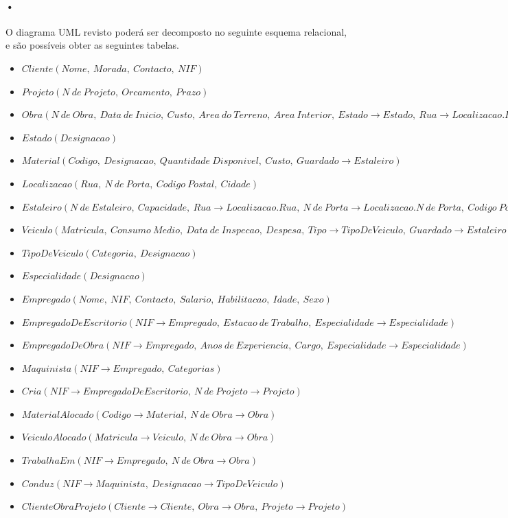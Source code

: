 \documentclass{report}
\begin{document}
		\paragraph{•}O diagrama UML revisto poderá ser decomposto no seguinte esquema
		relacional, e são possíveis obter as seguintes tabelas.
		
		\begin{itemize}
			\item $Cliente(Nome,\ Morada,\ Contacto,\ NIF)$
			\item $Projeto(N\ de\ Projeto,\ Orcamento,\ Prazo)$
			\item $Obra(N\ de\ Obra,\ Data\ de\ Inicio,\ Custo,\ Area\ do\ Terreno,\ Area\
			Interior,\ Estado \rightarrow Estado,\ Rua \rightarrow Localizacao.Rua,\ N\ de\ 
			Porta \rightarrow Localizacao.N\ de\ Porta,\ Codigo\ Postal \rightarrow
			Localizacao.Codigo\ Postal)$
			\item $Estado(Designacao)$
			\item $Material(Codigo,\ Designacao,\ Quantidade\ Disponivel,\ Custo,\ Guardado
			\rightarrow Estaleiro)$
			\item $Localizacao(Rua,\ N\ de\ Porta,\ Codigo\ Postal,\ Cidade)$
			\item $Estaleiro(N\ de\ Estaleiro,\ Capacidade,\ Rua \rightarrow Localizacao.Rua,\
			N\ de\ Porta \rightarrow Localizacao.N\ de\ Porta,\ Codigo\ Postal \rightarrow
			Localizacao.Codigo\ Postal)$
			\item $Veiculo(Matricula,\ Consumo\ Medio,\ Data\ de\ Inspecao,\ Despesa,\ Tipo 
			\rightarrow TipoDeVeiculo,\ Guardado \rightarrow Estaleiro)$
			\item $TipoDeVeiculo(Categoria,\ Designacao)$
			\item $Especialidade(Designacao)$
			\item $Empregado(Nome,\ NIF,\  Contacto,\ Salario,\ Habilitacao,\ Idade,\ Sexo)$
			\item $EmpregadoDeEscritorio(NIF \rightarrow Empregado,\ Estacao\ de\ Trabalho,\
			Especialidade \rightarrow Especialidade)$
			\item $EmpregadoDeObra(NIF \rightarrow Empregado,\ Anos\ de\ Experiencia,\ Cargo,\
			Especialidade \rightarrow Especialidade)$
			\item $Maquinista(NIF \rightarrow Empregado,\ Categorias)$
			\item $Cria(NIF \rightarrow EmpregadoDeEscritorio,\ N\ de\ Projeto \rightarrow
			Projeto)$
			\item $MaterialAlocado(Codigo\rightarrow Material,\ N\ de\ Obra \rightarrow Obra)$
			\item $VeiculoAlocado(Matricula \rightarrow Veiculo,\ N\ de\ Obra \rightarrow
			Obra)$
			\item $TrabalhaEm(NIF \rightarrow Empregado,\ N\ de\ Obra \rightarrow Obra)$
			\item $Conduz(NIF \rightarrow Maquinista,\ Designacao \rightarrow TipoDeVeiculo)$
			\item $ClienteObraProjeto(Cliente \rightarrow Cliente,\ Obra \rightarrow Obra,\
			Projeto  \rightarrow Projeto)$
		\end{itemize}
	
\end{document}
